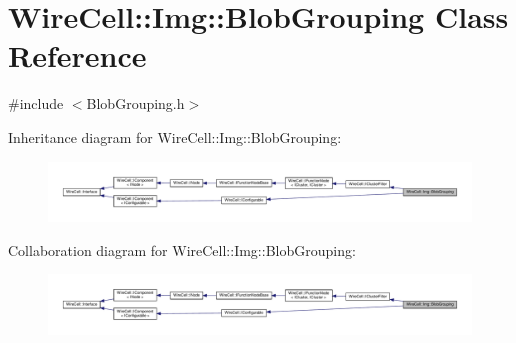 \hypertarget{class_wire_cell_1_1_img_1_1_blob_grouping}{}\section{Wire\+Cell\+:\+:Img\+:\+:Blob\+Grouping Class Reference}
\label{class_wire_cell_1_1_img_1_1_blob_grouping}


{\ttfamily \#include $<$Blob\+Grouping.\+h$>$}



Inheritance diagram for Wire\+Cell\+:\+:Img\+:\+:Blob\+Grouping\+:
\nopagebreak
\begin{figure}[H]
\begin{center}
\leavevmode
\includegraphics[width=350pt]{class_wire_cell_1_1_img_1_1_blob_grouping__inherit__graph}
\end{center}
\end{figure}


Collaboration diagram for Wire\+Cell\+:\+:Img\+:\+:Blob\+Grouping\+:
\nopagebreak
\begin{figure}[H]
\begin{center}
\leavevmode
\includegraphics[width=350pt]{class_wire_cell_1_1_img_1_1_blob_grouping__coll__graph}
\end{center}
\end{figure}
